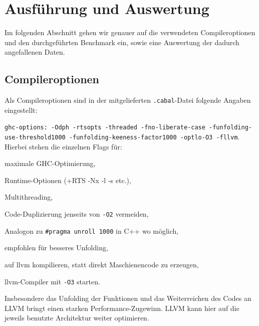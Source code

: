 \documentclass[a4paper]{scrartcl}
\begin{document}
\section{Ausführung und Auswertung}
Im folgenden Abschnitt gehen wir genauer auf die verwendeten Compileroptionen und den durchgeführten Benchmark ein, sowie eine Auswertung der dadurch angefallenen Daten.
\subsection{Compileroptionen}
Als Compileroptionen sind in der mitgelieferten \texttt{.cabal}-Datei folgende Angaben eingestellt:\par
\texttt{ghc-options: -Odph -rtsopts -threaded -fno-liberate-case -funfolding-use-threshold1000 -funfolding-keeness-factor1000 -optlo-O3 -fllvm}.
Hierbei stehen die einzelnen Flags für:
\begin{description}[style=multiline,leftmargin=6.5cm,font=\ttfamily\bfseries]
 \item[-Odph] maximale GHC-Optimierung,
 \item[-rtsopts] Runtime-Optionen (+RTS -Nx -l -s etc.),
 \item[-threaded] Multithreading,
 \item[-fno-liberate-case] Code-Duplizierung jenseits von \texttt{-O2} vermeiden,
 \item[-funfolding-use-threshold1000] Analogon zu \texttt{\#pragma unroll 1000} in C++ wo möglich,
 \item[-funfolding-keeness-factor1000] empfohlen für besseres Unfolding,
 \item[-fllvm] auf llvm kompilieren, statt direkt Maschienencode zu erzeugen,
 \item[-optlo-O3] llvm-Compiler mit \texttt{-O3} starten.
\end{description}
Insbesondere das Unfolding der Funktionen und das Weiterreichen des Codes an LLVM bringt einen starken Performance-Zugewinn. LLVM kann hier auf die jeweils benutzte Architektur weiter optimieren.
\end{document}

